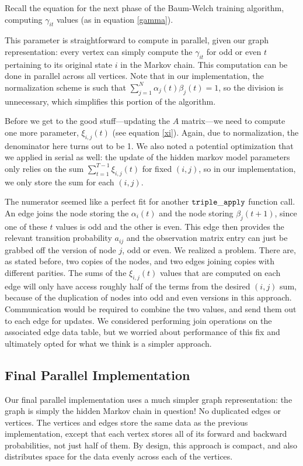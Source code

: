 Recall the equation for the next phase of the Baum-Welch training algorithm, computing $\gamma_{it}$ values (as in equation \ref{gamma}).

This parameter is straightforward to compute in parallel, given our graph representation: every vertex can simply compute the $\gamma_{it}$ for odd or even $t$ pertaining to its original state $i$ in the Markov chain.  This computation can be done in parallel across all vertices.   Note that in our implementation, the normalization scheme is such that $\sum_{j = 1}^N \alpha_{j}(t)\beta_{j}(t) = 1$, so the division is unnecessary, which simplifies this portion of the algorithm.

Before we get to the good stuff---updating the $A$ matrix---we need to compute
one more parameter, $\xi_{i,j}(t)$ (see equation \ref{xi}).
Again, due to normalization, the denominator here turns out to be 1.  We also
noted a potential optimization that we applied in serial as well: the update of
the hidden markov model parameters only relies on the sum $\sum_{t = 1}^{T-1}
\xi_{i,j}(t) $ for fixed $(i, j)$, so in our implementation, we only store the sum for each $(i, j)$.

The numerator seemed like a perfect fit for another $\tt{triple\_apply}$
function call.  An edge joins the node storing the $\alpha_{i}(t)$ and the node
storing $\beta_{j}(t+1)$, since one of these $t$ values is odd and the other is
even.  This edge then provides the relevant transition probability $a_{ij}$ and
the observation matrix entry can just be grabbed off the version of node $j$,
odd or even.  We realized a problem. There are, as stated before, two copies of
the nodes, and two edges joining copies with different parities.  The sums of
the $\xi_{i,j}(t)$ values that are computed on each edge will only have access roughly half of the terms from the desired $(i, j)$ sum, because of the duplication of nodes into odd and even versions in this approach.  Communication would be required to combine the two values, and send them out to each edge for updates.  We considered performing join operations on the associated edge data table, but we worried about performance of this fix and ultimately opted for what we think is a simpler approach.

\subsection{Final Parallel Implementation}

Our final parallel implementation uses a much simpler graph representation: the graph is simply the hidden Markov chain in question! No duplicated edges or vertices.  The vertices and edges store the same data as the previous implementation, except that each vertex stores all of its forward and backward probabilities, not just half of them.  By design, this approach is compact, and also distributes space for the data evenly across each of the vertices.

